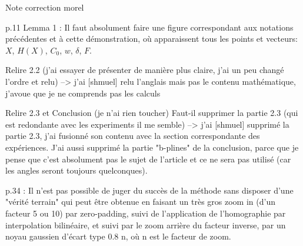 Note correction morel

p.11 Lemma 1 :  Il faut absolument faire une figure correspondant aux notations précédentes et à cette démonstration, où apparaissent tous  les points et vecteurs: $X$, $H(X)$, $C_0$, $w$, $\delta$, $F$.

Relire 2.2 (j’ai essayer de présenter de manière plus claire, j’ai un peu changé l’ordre et relu)
--> j'ai [shmuel] relu l'anglais mais pas le contenu mathématique, j'avoue que je ne comprends pas les calculs

Relire 2.3 et Conclusion (je n’ai rien toucher) 
Faut-il supprimer la partie 2.3 (qui est redondante avec les experiments il me semble)
--> j'ai [shmuel] supprimé la partie 2.3, j'ai fusionné son contenu avec la section correspondante des expériences. J'ai aussi supprimé la partie "b-plines" de la conclusion, parce que je pense que c'est absolument pas le sujet de l'article et ce ne sera pas utilisé (car les angles seront toujours quelconques).

p.34 : Il n'est pas possible de juger du succès de la méthode sans disposer d'une "vérité terrain" qui peut être obtenue en faisant un très gros zoom in (d'un facteur 5 ou 10) par zero-padding, suivi de l'application de l'homographie par interpolation bilinéaire, et suivi par le zoom arrière du facteur inverse, par un noyau gaussien d'écart type 0.8 n, où n est  le facteur de zoom.
